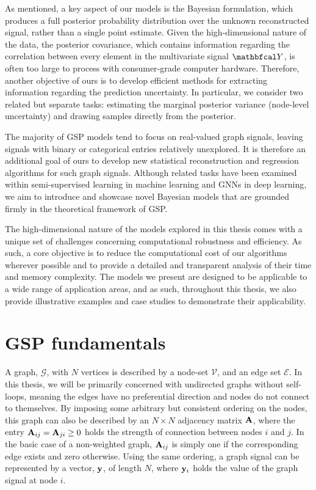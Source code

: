 
As mentioned, a key aspect of our models is the Bayesian formulation, which produces a full posterior probability distribution over the unknown reconstructed signal, rather than a single point estimate. Given the high-dimensional nature of the data, the posterior covariance, which contains information regarding the correlation between every element in the multivariate signal $\Yt$, is often too large to process with consumer-grade computer hardware. Therefore, another objective of ours is to develop efficient methods for extracting information regarding the prediction uncertainty. In particular, we consider two related but separate tasks: estimating the marginal posterior variance (node-level uncertainty) and drawing samples directly from the posterior. 


The majority of GSP models tend to focus on real-valued graph signals, leaving signals with binary or categorical entries relatively unexplored. It is therefore an additional goal of ours to develop new statistical reconstruction and regression algorithms for such graph signals. Although related tasks have been examined within semi-supervised learning in machine learning and GNNs in deep learning, we aim to introduce and showcase novel Bayesian models that are grounded firmly in the theoretical framework of GSP.


The high-dimensional nature of the models explored in this thesis comes with a unique set of challenges concerning computational robustness and efficiency. As such, a core objective is to reduce the computational cost of our algorithms wherever possible and to provide a detailed and transparent analysis of their time and memory complexity. The models we present are designed to be applicable to a wide range of application areas, and as such, throughout this thesis, we also provide illustrative examples and case studies to demonstrate their applicability. 

\newpage 


\section{GSP fundamentals}

\label{sec:fundamentals}

A graph, $\mathcal{G}$, with $N$ vertices is described by a node-set $\mathcal{V}$, and an edge set $\mathcal{E}$. In this thesis, we will be primarily concerned with undirected graphs without self-loops, meaning the edges have no preferential direction and nodes do not connect to themselves. By imposing some arbitrary but consistent ordering on the nodes, this graph can also be described by an $N \times N$ adjacency matrix $\mathbf{A}$, where the entry $\mathbf{A}_{ij} = \mathbf{A}_{ji} \geq 0$ holds the strength of connection between nodes $i$ and $j$. In the basic case of a non-weighted graph, $\mathbf{A}_{ij}$ is simply one if the corresponding edge exists and zero otherwise. Using the same ordering, a graph signal can be represented by a vector, $\mathbf{y}$, of length $N$, where $\mathbf{y}_i$ holds the value of the graph signal at node $i$. 

